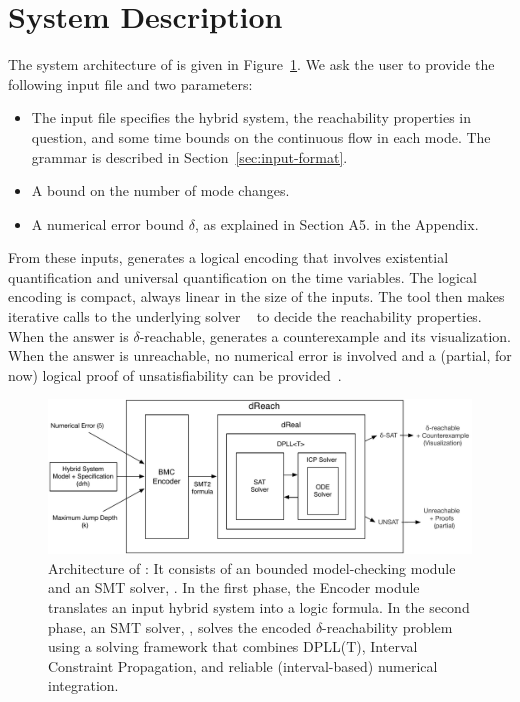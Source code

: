 \section{System Description}\label{sec:system}
The system architecture of \dReach{} is given in Figure~\ref{sec:system}. We ask the user to provide the following input file and two parameters:
\begin{itemize}
\item The input file specifies the hybrid system, the reachability
  properties in question, and some time bounds on the continuous flow in each mode.
  The grammar is described in
  Section~\ref{sec:input-format}.
\item A bound on the number of mode changes.
\item A numerical error bound $\delta$, as explained in Section A5. in the Appendix.
\end{itemize}
From these inputs, \dReach{} generates a logical encoding that involves existential quantification and universal quantification on the time variables. The logical encoding is compact, always linear in the size of the inputs. The tool then makes iterative calls to the underlying solver \dReal{}~\cite{DBLP:conf/cade/GaoKC13} to decide the reachability properties. When the answer is {\sf $\delta$-reachable}, \dReach{} generates a counterexample and its visualization. When the answer is {\sf unreachable}, no numerical error is involved and a (partial, for now) logical proof of unsatisfiability can be provided~\cite{SYNASC14}.
\begin{figure}[!h]
  \centering
  \includegraphics[width=\textwidth]{images/dreach_archi}
  \caption{Architecture of \dReach{}: It consists of an bounded
    model-checking module and an SMT solver, \dReal{}. In the first
    phase, the Encoder module translates an input hybrid system into a
    logic formula. In the second phase, an
    SMT solver, \dReal{}, solves the encoded $\delta$-reachability
    problem using a solving framework that combines DPLL(T), Interval Constraint Propagation, and reliable (interval-based) numerical integration.
  }\label{fig:system-description}
\end{figure}




